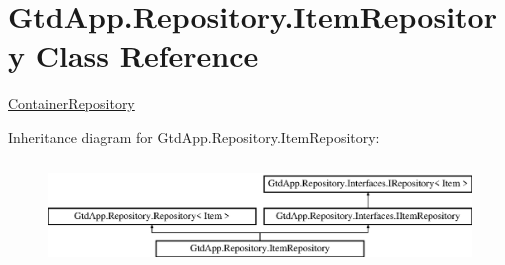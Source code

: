 \hypertarget{class_gtd_app_1_1_repository_1_1_item_repository}{}\section{Gtd\+App.\+Repository.\+Item\+Repository Class Reference}
\label{class_gtd_app_1_1_repository_1_1_item_repository}


\mbox{\hyperlink{class_gtd_app_1_1_repository_1_1_container_repository}{Container\+Repository}}  


Inheritance diagram for Gtd\+App.\+Repository.\+Item\+Repository\+:\begin{figure}[H]
\begin{center}
\leavevmode
\includegraphics[height=2.809365cm]{class_gtd_app_1_1_repository_1_1_item_repository}
\end{center}
\end{figure}

